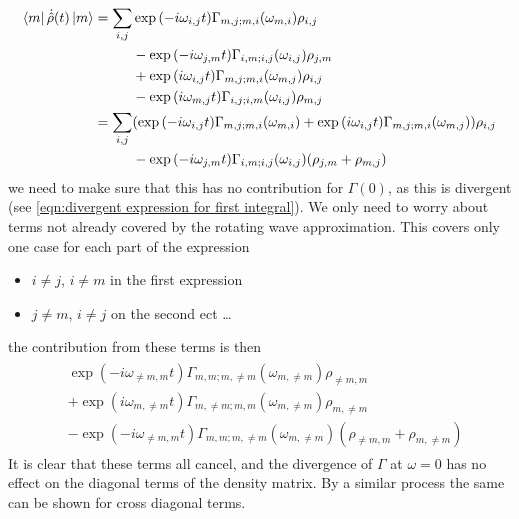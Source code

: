\begin{align}
    \bra{m}\dot{\hat{\rho}}(t) \ket{m} & = \begin{aligned}[t]
        \sum_{i,j} &
        \exp{(-i\omega_{i,j} t)}
        \Gamma_{m,j;m, i}(\omega_{m,i})
        \rho_{i,j}   \\
                   &
        -\exp{(-i\omega_{j,m} t)}
        \Gamma_{i,m;i, j}(\omega_{i,j})
        \rho_{j, m}  \\
                   &
        +\exp{(i\omega_{i,j} t)}
        \Gamma_{m,j; m, i}(\omega_{m,j})
        \rho_{i, j}  \\
                   &
        -\exp{(i\omega_{m,j} t)}
        \Gamma_{i,j; i, m}(\omega_{i,j})
        \rho_{m, j}
    \end{aligned} \\
                                       & = \begin{aligned}[t]
        \sum_{i,j} &
        (\exp{(-i\omega_{i,j} t)}
        \Gamma_{m,j;m, i}(\omega_{m,i})
        +\exp{(i\omega_{i,j} t)}
        \Gamma_{m,j; m, i}(\omega_{m,j})
        )\rho_{i,j}                 \\
                   &
        -\exp{(-i\omega_{j,m} t)}
        \Gamma_{i,m;i, j}(\omega_{i,j})
        (\rho_{j, m} + \rho_{m, j}) \\
    \end{aligned}
\end{align}
we need to make sure that this
has no contribution for
\(\Gamma(0)\), as this is divergent
(see \cref{eqn:divergent expression for first integral}).
We only need
to worry about terms not already
covered by the rotating wave approximation.
This covers only one case for each part of
the expression
\begin{itemize}
    \item \(i \neq j\), \(i \neq m\) in the
          first expression
    \item \(j\neq m\), \(i \neq j\) on the
          second ect \ldots
\end{itemize}
the contribution from these
terms is then
\begin{align}
    \begin{aligned}
         & \exp{(-i\omega_{\neq m,m} t)}
        \Gamma_{m,m;m, \neq m}(\omega_{m,\neq m})
        \rho_{\neq m,m}                  \\
         &
        +\exp{(i\omega_{m,\neq m} t)}
        \Gamma_{m,\neq m; m, m}(\omega_{m,\neq m})
        \rho_{m,\neq m}                  \\
         &
        -\exp{(-i\omega_{\neq m,m} t)}
        \Gamma_{m,m;m, \neq m}(\omega_{m,\neq m})
        (\rho_{\neq m, m} + \rho_{m, \neq m})
    \end{aligned}
\end{align}
It is clear that these terms all cancel,
and the divergence of \(\Gamma \) at \(\omega = 0\)
has no effect on the diagonal terms of the
density matrix. By a similar process the same can
be shown for cross diagonal terms.